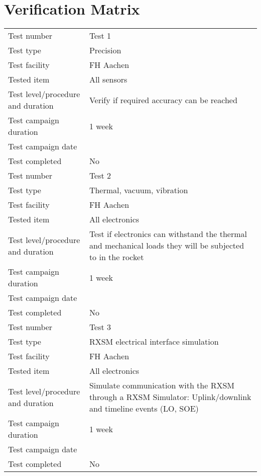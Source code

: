 \documentclass[11pt]{scrartcl}
\begin{document}
 \section{Verification Matrix}
 \begin{center}
	\begin{longtable}{| p{} | p{} |}
		\hline
		
		Test number & Test 1 \\
		Test type & Precision \\
		Test facility & FH Aachen \\
		Tested item & All sensors \\
		Test level/procedure and duration & Verify if required accuracy can be reached \\
		Test campaign duration & 1 week \\
		Test campaign date &  \\
		Test completed & No \\
		
		\hline\hline
		
		Test number & Test 2 \\
		Test type & Thermal, vacuum, vibration \\
		Test facility & FH Aachen \\
		Tested item & All electronics \\
		Test level/procedure and duration & Test if electronics can withstand the thermal and mechanical loads they will be subjected to in the rocket \\
		Test campaign duration & 1 week \\
		Test campaign date &  \\
		Test completed & No \\
		
		\hline\hline
		
		Test number & Test 3 \\
		Test type & RXSM electrical interface simulation \\
		Test facility & FH Aachen \\
		Tested item & All electronics \\
		Test level/procedure and duration & Simulate communication with the RXSM through a RXSM Simulator: Uplink/downlink and timeline events (LO, SOE) \\
		Test campaign duration & 1 week \\
		Test campaign date &  \\
		Test completed & No \\
		
		\hline
		
	\end{longtable}
\end{center}
 
\end{document}
